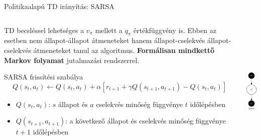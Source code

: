 \documentclass[english, aspectratio=169]{beamer}
\begin{document}
\begin{frame}{Politikaalapú TD irányítás: SARSA}
\begin{columns}
\begin{column}{.8\textwidth}
TD becsléssel lehetséges a $v_\pi$ mellett a $q_\pi$ értékfüggvény is. Ebben az esetben nem állapot-állapot átmeneteket hanem állapot-cselekvés állapot-cselekvés átmeneteket tanul az algoritmus. \textbf{Formálisan mindkettő Markov folyamat} jutalmazási rendszerrel. \par\smallskip
\begin{center}
\begin{block}{SARSA frissítési szabálya}
\[
Q(s_t,a_t) \leftarrow Q(s_t,a_t) + \alpha \left[ r_{t+1} + \gamma Q(s_{t+1},a_{t+1}) - Q(s_t,a_t) \right]
\]
\vspace{-0.5cm}
\begin{itemize}
	\item $Q(s_t,a_t)$: $s$ állapot és $a$ cselekvés minőség függvénye $t$ időlépésben
	\item $Q(s_{t+1},a_{t+1})$: a következő állapot és cselekvés minőség függvénye $t+1$ időlépésben
\end{itemize}
\end{block}
\end{center}
\end{column}
\begin{column}{.2\textwidth}
\begin{center}
\includegraphics[height=7cm, keepaspectratio]{graphs/mc_td_5.png}
\end{center}
\end{column}
\end{columns}
\end{frame}
\end{document}
